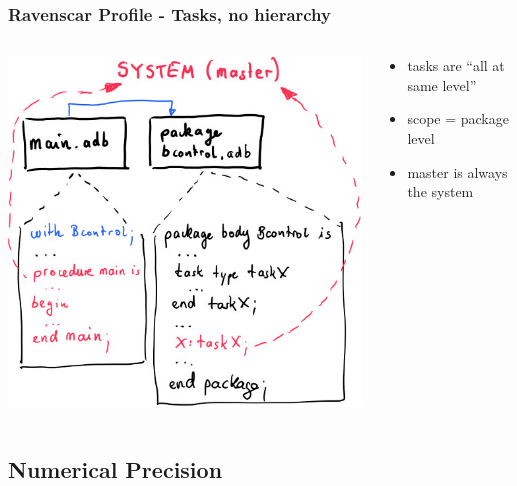 \begin{frame}[fragile]\frametitle{Ravenscar Profile - Tasks, no hierarchy}
  \begin{columns}
    \begin{column}[T]{0.6\textwidth}
      \includegraphics[height=.8\textheight]{content/images/spark/master}
    \end{column}

    \begin{column}[T]{0.4\textwidth}
      \begin{itemize}
      \item tasks are ``all at same level''
      \item scope = package level
      \item master is always the system
      \end{itemize}
    \end{column}
  \end{columns}
\end{frame}


\subsection{Numerical Precision}
